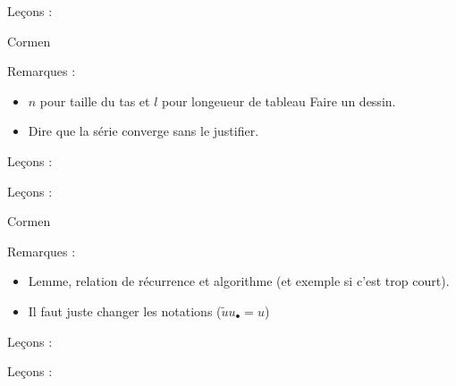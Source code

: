 \documentclass[../agregation.tex]{subfiles}
\begin{document}

Leçons :
\begin{itemize}
\end{itemize}
Cormen

Remarques :
\begin{itemize}
	\item $n$ pour taille du tas et $l$ pour longeueur de tableau
Faire un dessin.
	\item Dire que la série converge sans le justifier.
\end{itemize}

Leçons :
\begin{itemize}
\end{itemize}

Leçons :
\begin{itemize}
\end{itemize}

Cormen

Remarques :
\begin{itemize}
	\item Lemme, relation de récurrence et algorithme (et exemple si c'est trop court).
	\item Il faut juste changer les notations ($\widetilde{u}u_\bullet=u$)
\end{itemize}


Leçons :
\begin{itemize}
\end{itemize}


Leçons :
\begin{itemize}
\end{itemize}
\end{document}
